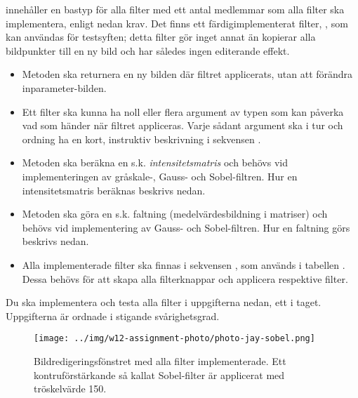 
\noindent {} innehåller en bastyp för alla filter med ett antal medlemmar som alla filter ska implementera, enligt nedan krav. Det finns ett färdigimplementerat filter, , som kan användas för testsyften; detta filter gör inget annat än kopierar alla bildpunkter till en ny bild och har således ingen editerande effekt.

\begin{itemize}
\item Metoden  ska returnera en ny bilden där filtret applicerats, utan att förändra inparameter-bilden. 

\item Ett filter ska kunna ha noll eller flera argument av typen  som kan påverka vad som händer när filtret appliceras. Varje sådant argument ska i tur och ordning ha en kort, instruktiv beskrivning i sekvensen .

\item Metoden  ska beräkna en s.k. \emph{intensitetsmatris} och behövs vid implementeringen av gråskale-, Gauss- och Sobel-filtren. Hur en intensitetsmatris beräknas beskrivs nedan. 

\item Metoden  ska göra en s.k. faltning (medelvärdesbildning i matriser) och behövs vid implementering av Gauss- och Sobel-filtren. Hur en faltning görs beskrivs nedan.

\item Alla implementerade filter ska finnas i sekvensen , som används i tabellen . Dessa behövs för att skapa alla filterknappar och applicera respektive filter.
\end{itemize}

\noindent Du ska implementera och testa alla filter i uppgifterna nedan, ett i taget. Uppgifterna är ordnade i stigande svårighetsgrad.

\begin{figure}
\centering
\texttt{[image: ../img/w12-assignment-photo/photo-jay-sobel.png]}
\caption{Bildredigeringsfönstret med alla filter implementerade. Ett kontruförstärkande så kallat Sobel-filter är applicerat med tröskelvärde 150.}
\label{photo:fig:photo-jay-sobel}
\end{figure}


